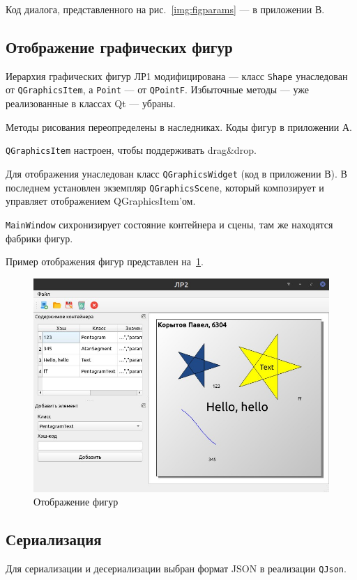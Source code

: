 \documentclass[a4paper, 14pt]{extarticle}
\begin{document}
Код диалога, представленного на рис.~\ref{img:figparams} --- в приложении В.

\subsection{Отображение графических фигур}
Иерархия графических фигур ЛР1 модифицирована --- класс \texttt{Shape} унаследован от \texttt{QGraphicsItem}, а \texttt{Point} --- от \texttt{QPointF}. Избыточные методы --- уже реализованные в классах Qt --- убраны.

Методы рисования переопределены в наследниках. Коды фигур в приложении А. 

\texttt{QGraphicsItem} настроен, чтобы поддерживать drag\&drop.

Для отображения унаследован класс \texttt{QGraphicsWidget} (код в приложении В). В последнем установлен экземпляр \texttt{QGraphicsScene}, который композирует и управляет отображением QGraphicsItem'ом.

\texttt{MainWindow} сихронизирует состояние контейнера и сцены, там же находятся фабрики фигур.

Пример отображения фигур представлен на~\ref{img:figures}.

\begin{figure}[h]
    \centering
    \includegraphics[width=\textwidth]{img/IMG_005.jpg}
    \caption{Отображение фигур}%
    \label{img:figures}
\end{figure}

\subsection{Сериализация}
Для сериализации и десериализации выбран формат JSON в реализации \texttt{QJson}.
\end{document}
